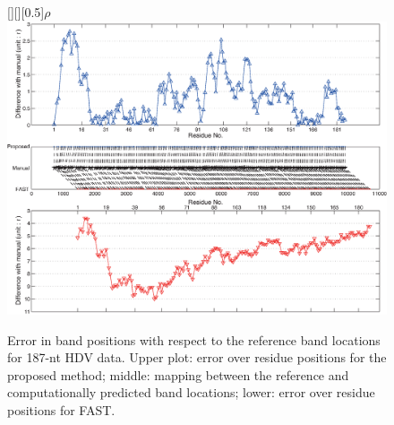 \documentclass[letter]{bioinfo}
\begin{document}
\begin{figure}
\centering
	[][][0.5]{$\rho$}
\includegraphics[width=\linewidth]{figures/FigureS6}
\caption{Error in band positions with respect to the reference band locations for 187-nt HDV data. Upper plot: error over residue positions for the proposed method; middle: mapping between the reference and computationally predicted band locations; lower: error over residue positions for FAST.}
\label{f:hdv-result-detail}
\end{figure}



\onecolumn

\end{document}
